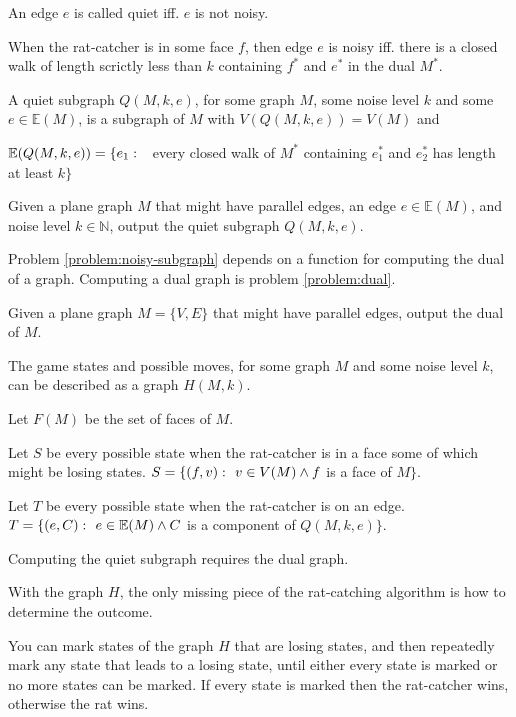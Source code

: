 \documentclass{article}
\begin{document}
		An edge $e$ is called quiet iff. $e$ is not noisy.

		\begin{definition}\label{def:face-quiet}
			When the rat-catcher is in some face $f$, then edge $e$ is noisy iff. there is a closed walk of length scrictly less than $k$ containing $f^*$ and $e^*$ in the dual $M^*$.
		\end{definition}

		A quiet subgraph $Q(M, k, e)$, for some graph $M$, some noise level $k$ and some $e \in \mathbb{E}(M)$, is a subgraph of $M$ with $V(Q(M, k, e)) = V(M)$ and

		$\mathbb{E}(Q(M, k, e)) = \{e_1 \,\colon\  $ every closed walk of $M^*$ containing $e_1^*$ and $e_2^*$ has length at least $k\}$

		\begin{problem}\label{problem:noisy-subgraph}
			Given a plane graph $M$ that might have parallel edges, an edge $e \in \mathbb{E}(M)$, and noise level $k \in \mathbb{N}$, output the quiet subgraph $Q(M, k, e)$.
		\end{problem}

		Problem \ref{problem:noisy-subgraph} depends on a function for computing the dual of a graph. Computing a dual graph is problem \ref{problem:dual}.

		\begin{problem}\label{problem:dual}
			Given a plane graph $M = \{V, E\}$ that might have parallel edges, output the dual of $M$.
		\end{problem}

		The game states and possible moves, for some graph $M$ and some noise level $k$, can be described as a graph $H(M, k)$.

		Let $F(M)$ be the set of faces of $M$.

		Let $S$ be every possible state when the rat-catcher is in a face some of which might be losing states. $S = \{ (f, v) \,\colon\  v \in V(M) \land f$ is a face of $ M \}$.

		Let $T$ be every possible state when the rat-catcher is on an edge. $T = \{ (e, C) \,\colon\  e \in \mathbb{E}(M) \land C$ is a component of $Q(M, k, e) \}$.

		Computing the quiet subgraph requires the dual graph. 
		
		With the graph $H$, the only missing piece of the rat-catching algorithm is how to determine the outcome.

		You can mark states of the graph $H$ that are losing states, and then repeatedly mark any state that leads to a losing state, until either every state is marked or no more states can be marked. If every state is marked then the rat-catcher wins, otherwise the rat wins.
\end{document}
